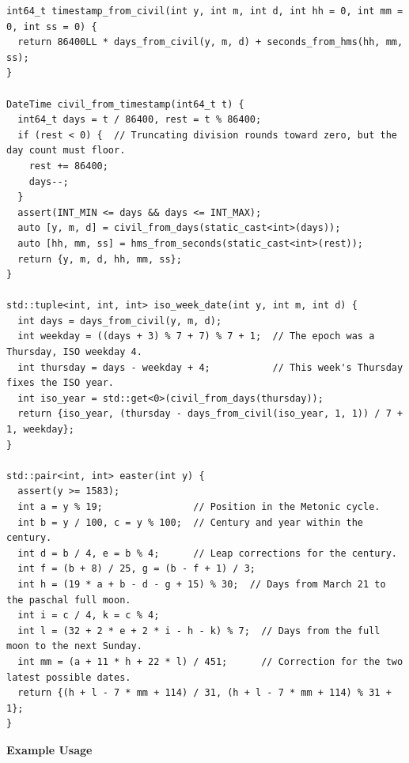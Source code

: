 \begin{lstlisting}[style=cpp]
int64_t timestamp_from_civil(int y, int m, int d, int hh = 0, int mm = 0, int ss = 0) {
  return 86400LL * days_from_civil(y, m, d) + seconds_from_hms(hh, mm, ss);
}

DateTime civil_from_timestamp(int64_t t) {
  int64_t days = t / 86400, rest = t % 86400;
  if (rest < 0) {  // Truncating division rounds toward zero, but the day count must floor.
    rest += 86400;
    days--;
  }
  assert(INT_MIN <= days && days <= INT_MAX);
  auto [y, m, d] = civil_from_days(static_cast<int>(days));
  auto [hh, mm, ss] = hms_from_seconds(static_cast<int>(rest));
  return {y, m, d, hh, mm, ss};
}

std::tuple<int, int, int> iso_week_date(int y, int m, int d) {
  int days = days_from_civil(y, m, d);
  int weekday = ((days + 3) % 7 + 7) % 7 + 1;  // The epoch was a Thursday, ISO weekday 4.
  int thursday = days - weekday + 4;           // This week's Thursday fixes the ISO year.
  int iso_year = std::get<0>(civil_from_days(thursday));
  return {iso_year, (thursday - days_from_civil(iso_year, 1, 1)) / 7 + 1, weekday};
}

std::pair<int, int> easter(int y) {
  assert(y >= 1583);
  int a = y % 19;                // Position in the Metonic cycle.
  int b = y / 100, c = y % 100;  // Century and year within the century.
  int d = b / 4, e = b % 4;      // Leap corrections for the century.
  int f = (b + 8) / 25, g = (b - f + 1) / 3;
  int h = (19 * a + b - d - g + 15) % 30;  // Days from March 21 to the paschal full moon.
  int i = c / 4, k = c % 4;
  int l = (32 + 2 * e + 2 * i - h - k) % 7;  // Days from the full moon to the next Sunday.
  int mm = (a + 11 * h + 22 * l) / 451;      // Correction for the two latest possible dates.
  return {(h + l - 7 * mm + 114) / 31, (h + l - 7 * mm + 114) % 31 + 1};
}
\end{lstlisting}
\textbf{Example Usage}\par
